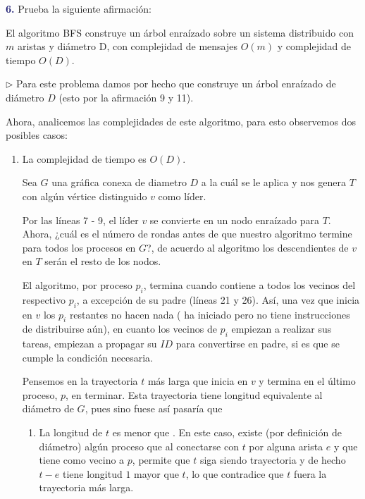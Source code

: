 \newpage
\textbf{\textcolor{MidnightBlue}{6.}}
Prueba la siguiente afirmación:

El algoritmo BFS construye un árbol enraízado
sobre un sistema distribuido con $m$ aristas
y diámetro D, con complejidad de mensajes
$O(m)$ y complejidad de tiempo $O(D)$. \newline

$\rhd$ Para este problema damos por hecho que
        construye un árbol enraízado
       de diámetro $D$ (esto por la afirmación 9 y 11).

       Ahora, analicemos las complejidades de este algoritmo,
       para esto observemos dos posibles casos:
       \begin{enumerate}
       \item La complejidad de tiempo es $O(D)$.\newline 
       
       Sea $G$ una gráfica conexa de diametro $D$ a la cuál
       se le aplica  y nos genera $T$ con algún
       vértice distinguido $v$ como líder.
       
       Por las líneas 7 - 9, el líder $v$ se convierte en un
       nodo enraízado para $T$. Ahora, ¿cuál es el número de
       rondas antes de que nuestro algoritmo termine para todos
       los procesos en $G$?, de acuerdo al algoritmo los
       descendientes de $v$ en $T$ serán el resto de los nodos.
       
       El algoritmo, por proceso $p_i$, termina cuando
        contiene a todos los vecinos
       del respectivo $p_i$, a excepción de su padre (líneas
       21 y 26). Así, una vez que  inicia en $v$
       los $p_i$ restantes no hacen nada ( ha iniciado
       pero no tiene instrucciones de distribuirse aún), en cuanto
       los vecinos de $p_i$ empiezan a realizar sus tareas,
       empiezan a propagar su $ID$ para convertirse en padre, si
       es que se cumple la condición necesaria.
       
       Pensemos en la trayectoria $t$  más larga que inicia en $v$ y
       termina en el último proceso, $p$, en terminar. Esta
       trayectoria tiene longitud equivalente al diámetro de $G$,
       pues sino fuese así pasaría que
       \begin{enumerate}
       \item La longitud de $t$ es menor que . En este
       caso, existe (por definición de diámetro) algún proceso que
       al conectarse con $t$ por alguna arista $e$ y que tiene como
       vecino a $p$, permite que $t$ siga siendo trayectoria y de hecho
       $t-e$ tiene longitud $1$ mayor que $t$, lo que contradice que
       $t$ fuera la trayectoria más larga.
       

\end{enumerate}
\end{enumerate}
